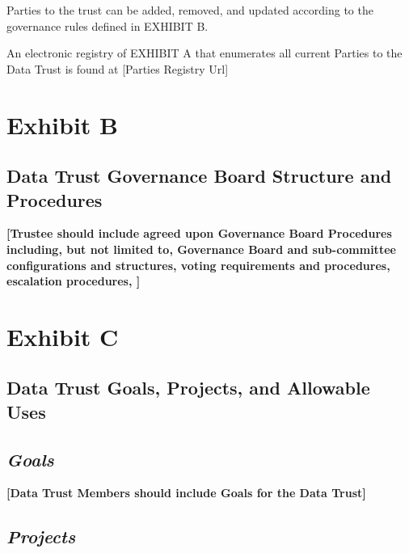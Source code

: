 \documentclass[]{book}
\begin{document}
Parties to the trust can be added, removed, and updated according to the governance rules defined in EXHIBIT B.

An electronic registry of EXHIBIT A that enumerates all current Parties to the Data Trust is found at {[}Parties Registry Url{]}

\hypertarget{exhibit-b}{%
\chapter*{Exhibit B}\label{exhibit-b}}

\hypertarget{data-trust-governance-board-structure-and-procedures}{%
\section*{Data Trust Governance Board Structure and Procedures}\label{data-trust-governance-board-structure-and-procedures}}

\textbf{{[}Trustee should include agreed upon Governance Board Procedures including, but not limited to, Governance Board and sub-committee configurations and structures, voting requirements and procedures, escalation procedures, {]}}

\hypertarget{exhibit-c}{%
\chapter*{Exhibit C}\label{exhibit-c}}

\hypertarget{data-trust-goals-projects-and-allowable-uses}{%
\section*{Data Trust Goals, Projects, and Allowable Uses}\label{data-trust-goals-projects-and-allowable-uses}}

\hypertarget{goals}{%
\section*{\texorpdfstring{\emph{Goals}}{Goals}}\label{goals}}

\textbf{{[}Data Trust Members should include Goals for the Data Trust{]}}

\hypertarget{projects}{%
\section*{\texorpdfstring{\emph{Projects}}{Projects}}\label{projects}}
\end{document}
